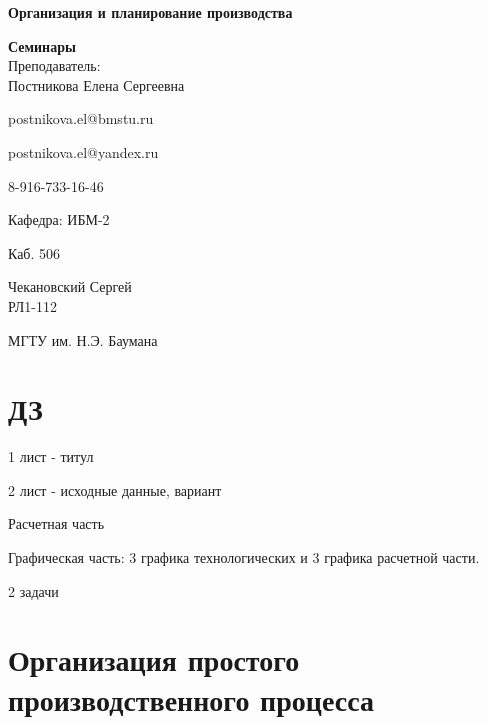 \documentclass[14pt,a4paper,oneside]{extarticle}
\begin{document}


\begin{titlepage}
    \begin{center}
        \vspace*{1cm}

        \Huge
        \textbf{Организация и планирование производства}
        \vspace{1.5cm}

        \vfill
        \Huge
        \textbf{Семинары}\\
        \vspace{0.5cm}
        \LARGE
        Преподаватель:\\Постникова Елена Сергеевна

        postnikova.el@bmstu.ru

        postnikova.el@yandex.ru

        8-916-733-16-46


        \vspace{1.5cm}

        Кафедра: ИБМ-2

        Каб. 506

        \vfill

        \LARGE
        Чекановский Сергей\\
        РЛ1-112

        \vspace{0.8cm}


        \Large
        МГТУ им. Н.Э. Баумана

    \end{center}
\end{titlepage}

\tableofcontents

\clearpage

\section{ДЗ}

1 лист - титул

2 лист - исходные данные, вариант

Расчетная часть 

Графическая часть: 3 графика технологических и 3 графика расчетной части.

2 задачи

\section{Организация простого производственного процесса}
\end{document}
